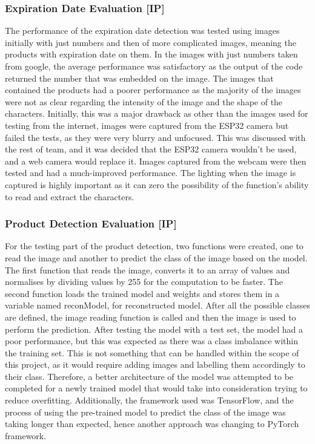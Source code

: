 \subsubsection{Expiration Date Evaluation [IP]}
The performance of the expiration date detection was tested using images initially with just numbers and then of more complicated images, meaning the products with expiration date on them.
In the images with just numbers taken from google, the average performance was satisfactory as the output of the code returned the number that was embedded on the image.
The images that contained the products had a poorer performance as the majority of the images were not as clear regarding the intensity of the image and the shape of the characters.
Initially, this was a major drawback as other than the images used for testing from the internet, images were captured from the ESP32 camera but failed the tests, as they were very blurry and unfocused.
This was discussed with the rest of team, and it was decided that the ESP32 camera wouldn't be used, and a web camera would replace it.
Images captured from the webcam were then tested and had a much-improved performance.
The lighting when the image is captured is highly important as it can zero the possibility of the function's ability to read and extract the characters.

\subsubsection{Product Detection Evaluation [IP]}
For the testing part of the product detection, two functions were created, one to read the image and another to predict the class of the image based on the model.
The first function that reads the image, converts it to an array of values and normalises by dividing values by 255 for the computation to be faster.
The second function loads the trained model and weights and stores them in a variable named reconModel, for reconstructed model.
After all the possible classes are defined, the image reading function is called and then the image is used to perform the prediction.
After testing the model with a test set, the model had a poor performance, but this was expected as there was a class imbalance within the training set.
This is not something that can be handled within the scope of this project, as it would require adding images and labelling them accordingly to their class.
Therefore, a better architecture of the model was attempted to be completed for a newly trained model that would take into consideration trying to reduce overfitting.
Additionally, the framework used was TensorFlow, and the process of using the pre-trained model to predict the class of the image was taking longer than expected, hence another approach was changing to PyTorch framework.


